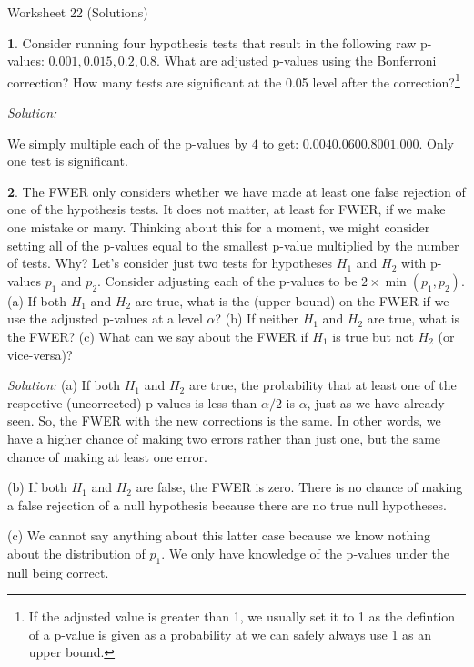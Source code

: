 \documentclass{tufte-handout}
\begin{document}
\justify

{\LARGE Worksheet 22 (Solutions)}

\vspace*{18pt}


\textbf{1}. Consider running four hypothesis tests that result in the following raw
p-values: $0.001, 0.015, 0.2, 0.8$. What are adjusted p-values using the
Bonferroni correction? How many tests are significant at the 0.05 level
after the correction?\footnote{
  If the adjusted value is greater than 1, we usually set it
  to 1 as the defintion of a p-value is given as a probability
  at we can safely always use 1 as an upper bound.
}

\textit{Solution:} %

We simply multiple each of the p-values by $4$ to get: 
$0.004 0.060 0.800 1.000$. Only one test is significant.

\textbf{2}. The FWER only considers whether we have made at least one false rejection
of one of the hypothesis tests. It does not matter, at least for FWER, if
we make one mistake or many. Thinking about this for a moment, we might
consider setting all of the p-values equal to the smallest p-value multiplied
by the number of tests. Why? Let's consider just two tests for hypotheses
$H_1$ and $H_2$ with p-values $p_1$ and $p_2$. Consider adjusting each 
of the p-values to be $2 \times \min(p_1, p_2)$. (a) If both $H_1$ and $H_2$
are true, what is the (upper bound) on the FWER if we use the adjusted
p-values at a level $\alpha$? (b) If neither $H_1$ and $H_2$ are true,
what is the FWER? (c) What can we say about the FWER if $H_1$ is true
but not $H_2$ (or vice-versa)?

\textit{Solution:} (a) If both $H_1$ and $H_2$ are true, the probability that at least one
of the respective (uncorrected) p-values is less than $\alpha / 2$ is
$\alpha$, just as we have already seen. So, the FWER with the new corrections
is the same. In other words, we have a higher chance of making two errors
rather than just one, but the same chance of making at least one error.

(b) If both $H_1$ and $H_2$ are false, the FWER is zero. There is no
chance of making a false rejection of a null hypothesis because there
are no true null hypotheses.

(c) We cannot say anything about this latter case because we know nothing
about the distribution of $p_1$. We only have knowledge of the p-values 
under the null being correct. 
\end{document}
